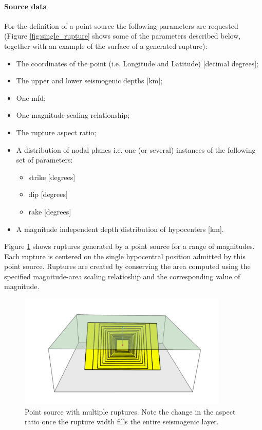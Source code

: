 \paragraph{Source data}
%
For the definition of a point source the following 
parameters are requested (Figure \ref{fig:single_rupture} shows some of 
the parameters described below, together with an example of the 
surface of a generated rupture):
\begin{itemize}
\item The coordinates of the point (i.e. Longitude and Latitude) [decimal 
    degrees];
\item The upper and lower seismogenic depths [km];
\item One \gls{mfd};
\item One magnitude-scaling relationship;
\item The rupture aspect ratio;
\item A distribution of nodal planes i.e. one (or several) instances 
    of the following set of parameters:
\begin{itemize}
    \item \gls{strike} [degrees]
    \item \gls{dip} [degrees]
    \item \gls{rake} [degrees]
\end{itemize}
\item A magnitude independent depth distribution of hypocenters [km]. 
\end{itemize}
%
Figure \ref{fig:point_source_multiple_ruptures} shows ruptures 
generated by a point source for a range of magnitudes. 
Each rupture is centered on the single hypocentral position 
admitted by this point source. 
Ruptures are created by conserving the area computed
using the specified mag\-ni\-tude-area scaling relatioship and the
corresponding value of magnitude.
\begin{figure}[ht!]
\centering
\includegraphics[width=10cm]{./figures/hazard/point_source_multiple_ruptures.pdf}
\caption{Point source with multiple ruptures. Note the change in the aspect 
ratio once the rupture width fills the entire seismogenic layer.}
\label{fig:point_source_multiple_ruptures}
\end{figure}

